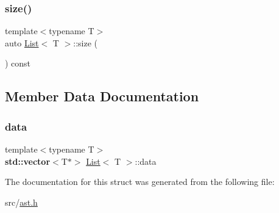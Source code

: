 \subsubsection{\texorpdfstring{size()}{size()}}
{\footnotesize\ttfamily template$<$typename T$>$ \\
auto \hyperlink{struct_list}{List}$<$ T $>$\+::size (\begin{DoxyParamCaption}{ }\end{DoxyParamCaption}) const\hspace{0.3cm}{\ttfamily [inline]}}



\subsection{Member Data Documentation}
\mbox{\label{struct_list_a63c9cd234577800ed4664dcefebba10e}} 
\subsubsection{\texorpdfstring{data}{data}}
{\footnotesize\ttfamily template$<$typename T$>$ \\
\textbf{ std\+::vector}$<$T$\ast$$>$ \hyperlink{struct_list}{List}$<$ T $>$\+::data}



The documentation for this struct was generated from the following file\+:\begin{DoxyCompactItemize}
\item 
src/\hyperlink{ast_8h}{ast.\+h}\end{DoxyCompactItemize}
